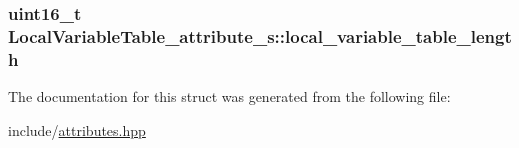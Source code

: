 \hypertarget{structLocalVariableTable__attribute__s_ac48b8efc7da2e7b280f3c592cc201888}{
\subsubsection[{local\+\_\+variable\+\_\+table\+\_\+length}]{\setlength{\rightskip}{0pt plus 5cm}uint16\+\_\+t Local\+Variable\+Table\+\_\+attribute\+\_\+s\+::local\+\_\+variable\+\_\+table\+\_\+length}}\label{structLocalVariableTable__attribute__s_ac48b8efc7da2e7b280f3c592cc201888}


The documentation for this struct was generated from the following file\+:\begin{DoxyCompactItemize}
\item 
include/\hyperlink{attributes_8hpp}{attributes.\+hpp}\end{DoxyCompactItemize}
